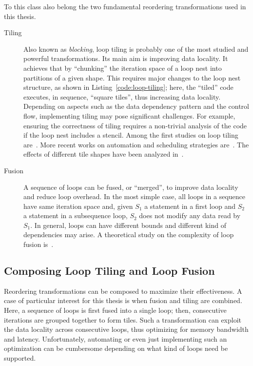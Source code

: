 To this class also belong the two fundamental reordering transformations used in this thesis.
\begin{description}
\item[Tiling] Also known as {\em blocking}, loop tiling is probably one of the most studied and powerful transformations. Its main aim is improving data locality. It achieves that by ``chunking'' the iteration space of a loop nest into partitions of a given shape. This requires major changes to the loop nest structure, as shown in Listing~\ref{code:loop-tiling}; here, the ``tiled'' code executes, in sequence, ``square tiles'', thus increasing data locality. Depending on aspects such as the data dependency pattern and the control flow, implementing tiling may pose significant challenges. For example, ensuring the correctness of tiling requires a non-trivial analysis of the code if the loop nest includes a stencil. Among the first studies on loop tiling are~\cite{early-tile-cite-1,early-tile-cite-2}. More recent works on automation and scheduling strategies are~\cite{recent-tile-cite-1,recent-tile-cite-2,recent-tile-cite-3}. The effects of different tile shapes have been analyzed in~\cite{tile-shape-1,tile-shape-2}. 
\item[Fusion] A sequence of loops can be fused, or ``merged'', to improve data locality and reduce loop overhead. In the most simple case, all loops in a sequence have same iteration space and, given $S_1$ a statement in a first loop and $S_2$ a statement in a subsequence loop, $S_2$ does not modify any data read by $S_1$. In general, loops can have different bounds and different kind of dependencies may arise. A theoretical study on the complexity of loop fusion is~\cite{fusion-complexity}. 
\end{description}

\subsection{Composing Loop Tiling and Loop Fusion}
\label{sec:bkg:tiling}
Reordering transformations can be composed to maximize their effectiveness. A case of particular interest for this thesis is when fusion and tiling are combined. Here, a sequence of loops is first fused into a single loop; then, consecutive iterations are grouped together to form tiles. Such a transformation can exploit the data locality across consecutive loops, thus optimizing for memory bandwidth and latency. Unfortunately, automating or even just implementing such an optimization can be cumbersome depending on what kind of loops need be supported. 


